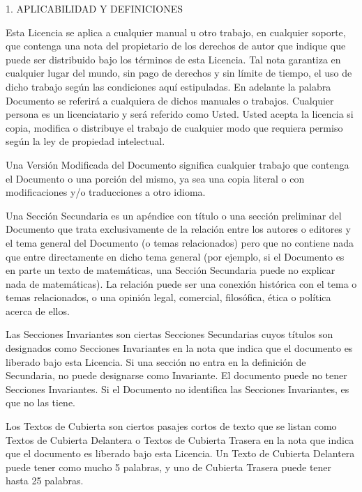 \documentclass[a4paper, 11pt, oneside]{report}
\begin{document}
1. APLICABILIDAD Y DEFINICIONES

Esta Licencia se aplica a cualquier manual u otro trabajo, en cualquier soporte, que contenga una nota del propietario de los derechos de autor que indique que puede ser distribuido bajo los términos de esta Licencia. Tal nota garantiza en cualquier lugar del mundo, sin pago de derechos y sin límite de tiempo, el uso de dicho trabajo según las condiciones aquí estipuladas. En adelante la palabra Documento se referirá a cualquiera de dichos manuales o trabajos. Cualquier persona es un licenciatario y será referido como Usted. Usted acepta la licencia si copia, modifica o distribuye el trabajo de cualquier modo que requiera permiso según la ley de propiedad intelectual.

Una Versión Modificada del Documento significa cualquier trabajo que contenga el Documento o una porción del mismo, ya sea una copia literal o con modificaciones y/o traducciones a otro idioma.

Una Sección Secundaria es un apéndice con título o una sección preliminar del Documento que trata exclusivamente de la relación entre los autores o editores y el tema general del Documento (o temas relacionados) pero que no contiene nada que entre directamente en dicho tema general (por ejemplo, si el Documento es en parte un texto de matemáticas, una Sección Secundaria puede no explicar nada de matemáticas). La relación puede ser una conexión histórica con el tema o temas relacionados, o una opinión legal, comercial, filosófica, ética o política acerca de ellos.

Las Secciones Invariantes son ciertas Secciones Secundarias cuyos títulos son designados como Secciones Invariantes en la nota que indica que el documento es liberado bajo esta Licencia. Si una sección no entra en la definición de Secundaria, no puede designarse como Invariante. El documento puede no tener Secciones Invariantes. Si el Documento no identifica las Secciones Invariantes, es que no las tiene.

Los Textos de Cubierta son ciertos pasajes cortos de texto que se listan como Textos de Cubierta Delantera o Textos de Cubierta Trasera en la nota que indica que el documento es liberado bajo esta Licencia. Un Texto de Cubierta Delantera puede tener como mucho 5 palabras, y uno de Cubierta Trasera puede tener hasta 25 palabras.
\end{document}
